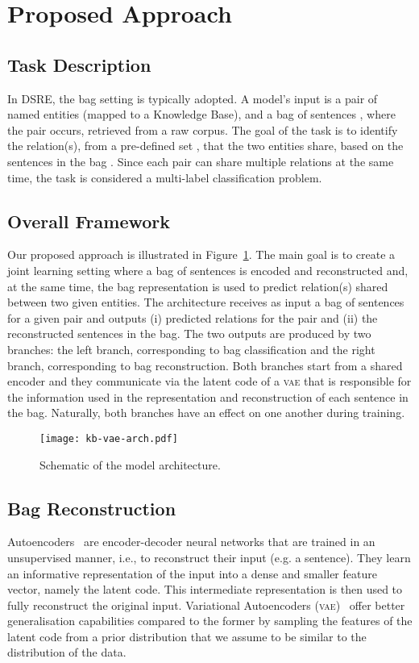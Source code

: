 \documentclass[11pt]{article}
\begin{document}
\section{Proposed Approach}

\subsection{Task Description}
In DSRE, the bag setting is typically adopted. A model's input is a pair of named entities  (mapped to a Knowledge Base), and a bag of sentences , where the pair occurs, retrieved from a raw corpus. The goal of the task is to identify the relation(s), from a pre-defined set , that the two entities share, based on the sentences in the bag . Since each pair can share multiple relations at the same time, the task is considered a multi-label classification problem.

\subsection{Overall Framework}
Our proposed approach is illustrated in Figure~\ref{fig:arch}. 
The main goal is to create a joint learning setting where a bag of sentences is encoded and reconstructed and, at the same time, the bag representation is used to predict relation(s) shared between two given entities.
The architecture receives as input a bag of sentences for a given pair and outputs (i) predicted relations for the pair and (ii) the reconstructed sentences in the bag.
The two outputs are produced by two branches: the left branch, corresponding to bag classification and the right branch, corresponding to bag reconstruction. 
Both branches start from a shared encoder and they communicate via the latent code of a \textsc{vae} that is responsible for the information used in the representation and reconstruction of each sentence in the bag. Naturally, both branches have an effect on one another during training.



\begin{figure}[t!]
    \centering
    \texttt{[image: kb-vae-arch.pdf]}
    \caption{Schematic of the model architecture.}
    \label{fig:arch}
\end{figure}



\subsection{Bag Reconstruction}
\label{sec:bag_reco}
Autoencoders~\citep{rumelhart1986autoencoders} are encoder-decoder neural networks that are trained in an unsupervised manner, i.e., to reconstruct their input (e.g. a sentence). They learn an informative representation of the input into a dense and smaller feature vector, namely the latent code. This intermediate representation is then used to fully reconstruct the original input.
Variational Autoencoders (\textsc{vae})~\citep{kingma2013auto} offer better generalisation capabilities compared to the former by sampling the features of the latent code from a prior distribution that we assume to be similar to the distribution of the data.
\end{document}
